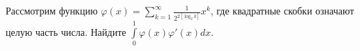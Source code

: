 \documentclass{article}
\begin{document}
Рассмотрим функцию $\varphi(x) = \sum\limits_{k=1}^\infty \frac{1}{2^{2[\log_2 k]}} x^k$, где квадратные скобки означают целую часть числа. Найдите $\int\limits_0^1 \varphi(x) \varphi'(x) dx$.
\end{document}
